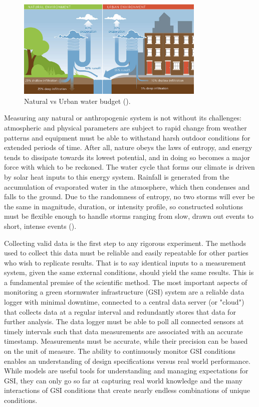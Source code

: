 \begin{figure}[ht]
	\centering
	\includegraphics[width=0.8\textwidth]{gfx/chapter-instrumentation/naturalvsurbanrunoff.jpg}
	\caption[Natural vs Urban water budget.]{Natural vs Urban water budget (\cite{PhiladelphiaWaterDepartment2021}).}
	\label{fig:urban-water-budget}
\end{figure}

Measuring any natural or anthropogenic system is not without its challenges: atmospheric and physical parameters are subject to rapid change from weather patterns and equipment must be able to withstand harsh outdoor conditions for extended periods of time.
After all, nature obeys the laws of entropy, and energy tends to dissipate towards its lowest potential, and in doing so becomes a major force with which to be reckoned.
The water cycle that forms our climate is driven by solar heat inputs to this energy system.
Rainfall is generated from the accumulation of evaporated water in the atmosphere, which then condenses and falls to the ground.
Due to the randomness of entropy, no two storms will ever be the same in magnitude, duration, or intensity profile, so constructed solutions must be flexible enough to handle storms ranging from slow, drawn out events to short, intense events (\cite{Dourte2015, Maier2020}).

Collecting valid data is the first step to any rigorous experiment.
The methods used to collect this data must be reliable and easily repeatable for other parties who wish to replicate results.
That is to say identical inputs to a measurement system, given the same external conditions, should yield the same results.
This is a fundamental premise of the scientific method.
The most important aspects of monitoring a green stormwater infrastructure (GSI) system are a reliable data logger with minimal downtime, connected to a central data server (or "cloud") that collects data at a regular interval and redundantly stores that data for further analysis.
The data logger must be able to poll all connected sensors at timely intervals such that data measurements are associated with an accurate timestamp.
Measurements must be accurate, while their precision can be based on the unit of measure.
The ability to continuously monitor GSI conditions enables an understanding of design specifications versus real world performance.
While models are useful tools for understanding and managing expectations for GSI, they can only go so far at capturing real world knowledge and the many interactions of GSI conditions that create nearly endless combinations of unique conditions.

